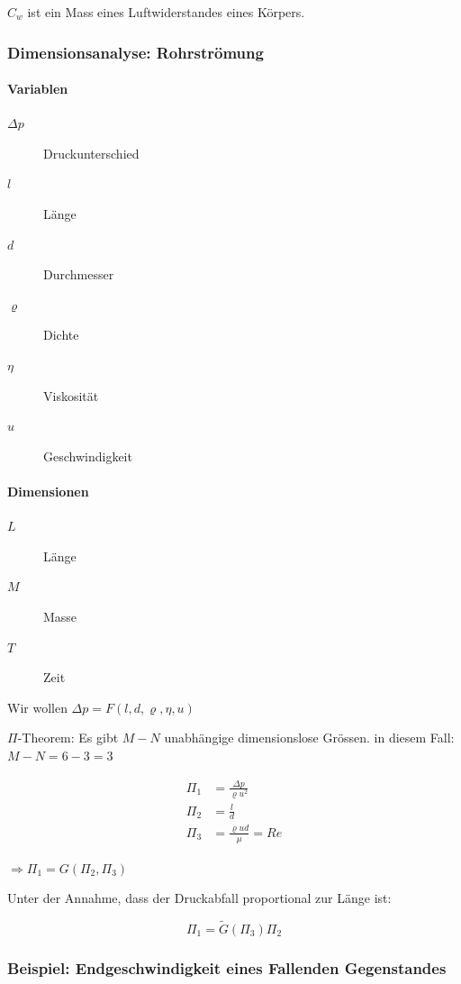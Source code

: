 \documentclass[a4paper]{scrartcl}
\begin{document}
$C_w$ ist ein Mass eines Luftwiderstandes eines Körpers.


\subsubsection{Dimensionsanalyse: Rohrströmung}
\paragraph{Variablen}
\begin{description}
	
\item[$\Delta p$] Druckunterschied
\item[$l$] Länge
\item[$d$] Durchmesser
\item[$\varrho$] Dichte
\item[$\eta$] Viskosität
\item[$u$] Geschwindigkeit
\end{description}

\paragraph{Dimensionen}
\begin{description}
	\item[$L$] Länge
	\item[$M$] Masse
	\item[$T$] Zeit
\end{description}

Wir wollen $\Delta p = F(l, d, \varrho, \eta, u)$


$\Pi$-Theorem: Es gibt $M-N$ unabhängige dimensionslose Grössen. in diesem Fall: $M-N = 6-3 = 3$

\begin{align*}
\Pi_1 &= \frac{\Delta p}{\varrho u^2} \\
\Pi_2 &= \frac{l}{d} \\
\Pi_3 &= \frac{\varrho u d}{\mu} = Re
\end{align*}

$\Rightarrow \Pi_1 = G(\Pi_2, \Pi_3)$

Unter der Annahme, dass der Druckabfall proportional zur Länge ist:

\[
	\Pi_1 = \tilde{G}(\Pi_3)\Pi_2
\]



\subsubsection{Beispiel: Endgeschwindigkeit eines Fallenden Gegenstandes}
\end{document}
